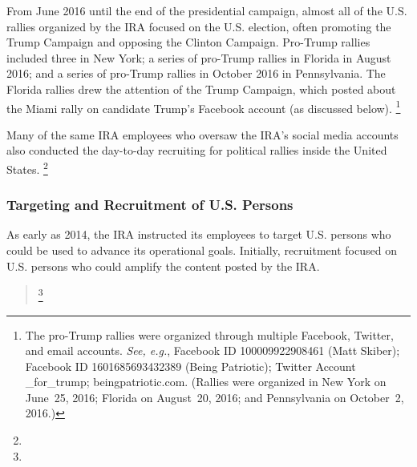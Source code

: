 From June 2016 until the end of the presidential campaign, almost all of the U.S. rallies organized by the IRA focused on the U.S. election, often promoting the Trump Campaign and opposing the Clinton Campaign.
Pro-Trump rallies included three in New York; a series of pro-Trump rallies in Florida in August 2016; and a series of pro-Trump rallies in October 2016 in Pennsylvania.
The Florida rallies drew the attention of the Trump Campaign, which posted about the Miami rally on candidate Trump's Facebook account (as discussed below).%
\footnote{The pro-Trump rallies were organized through multiple Facebook, Twitter, and email accounts.
\textit{See, e.g.}, Facebook ID 100009922908461 (Matt Skiber);
Facebook ID 1601685693432389 (Being Patriotic);
Twitter Account \@march\_for\_trump;
beingpatriotic\@gmail.com.
(Rallies were organized in New York on June~25, 2016; Florida on August~20, 2016; and Pennsylvania on October~2, 2016.)}

Many of the same IRA employees who oversaw the IRA's social media accounts also conducted the day-to-day recruiting for political rallies inside the United States.
\footnote{}

\subsubsection{Targeting and Recruitment of U.S. Persons}

As early as 2014, the IRA instructed its employees to target U.S. persons who could be used to advance its operational goals.
Initially, recruitment focused on U.S. persons who could amplify the content posted by the IRA\null.

\begin{quote}
\footnote{}
\end{quote}

